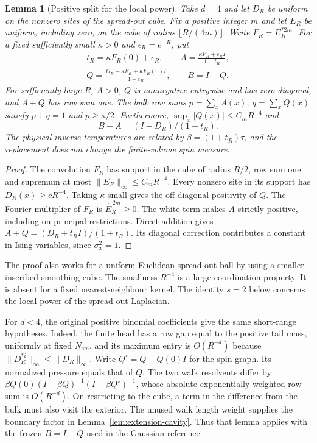 \documentclass[11pt]{article}
\newtheorem{lemma}[theorem]{Lemma}
\theoremstyle{definition}
\begin{document}
\begin{lemma}[Positive split for the local power]
\label{lem:local-split}
Take \(d=4\) and let \(D_R\) be uniform on the nonzero sites of
the spread-out cube. Fix a positive integer \(m\) and let
\(E_R\) be uniform, including zero, on the cube of radius
\(\lfloor R/(4m)\rfloor\). Write \(F_R=E_R^{*2m}\). For a fixed
sufficiently small \(\kappa>0\) and \(\epsilon_R=e^{-R}\), put
\begin{equation}
 \begin{gathered}
 t_R=\kappa F_R(0)+\epsilon_R,\qquad
 A=\frac{\kappa F_R+\epsilon_R I}{1+t_R},\\
 Q=\frac{D_R-\kappa F_R+\kappa F_R(0)I}{1+t_R},\qquad B=I-Q .
 \end{gathered}
\end{equation}
For sufficiently large \(R\), \(A>0\), \(Q\) is nonnegative
entrywise and has zero diagonal, and \(A+Q\) has row sum one.
The bulk row sums \(p=\sum_xA(x)\), \(q=\sum_xQ(x)\) satisfy
\(p+q=1\) and \(p\ge\kappa/2\). Furthermore,
\(\sup_x |Q(x)|\le C_m R^{-4}\) and
\begin{equation}
 B-A=(I-D_R)/(1+t_R).
\end{equation}
The physical inverse temperatures are related by
\(\beta=(1+t_R)\tau\), and the replacement does not change the
finite-volume spin measure.
\end{lemma}

\begin{proof}
The convolution \(F_R\) has support in the cube of radius \(R/2\),
row sum one and supremum at most \(\|E_R\|_\infty\le C_m R^{-4}\).
Every nonzero site in its support has \(D_R(x)\ge cR^{-4}\).
Taking \(\kappa\) small gives the off-diagonal positivity of \(Q\).
The Fourier multiplier of \(F_R\) is \(\widehat E_R^{\,2m}\ge0\).
The white term makes \(A\) strictly positive, including on
principal restrictions. Direct addition gives
\(A+Q=(D_R+t_RI)/(1+t_R)\). Its diagonal correction contributes a
constant in Ising variables, since \(\sigma_x^2=1\).
\end{proof}

The proof also works for a uniform Euclidean spread-out ball by
using a smaller inscribed smoothing cube. The smallness
\(R^{-4}\) is a large-coordination property. It is absent for a
fixed nearest-neighbour kernel. The identity \(s=2\) below concerns
the local power of the spread-out Laplacian.

For \(d<4\), the original positive binomial coefficients give the
same short-range hypotheses. Indeed, the finite head has a row
gap equal to the positive tail mass, uniformly at fixed
\(N_{\mathrm{sm}}\), and its maximum entry is \(O(R^{-d})\) because
\(\|D_R^{*i}\|_\infty\le\|D_R\|_\infty\). Write \(Q^\circ=Q-Q(0)I\) for the spin graph. Its normalized
pressure equals that of \(Q\). The two walk resolvents differ by
\(\beta Q(0)(I-\beta Q)^{-1}(I-\beta Q^\circ)^{-1}\), whose absolute
exponentially weighted row sum is \(O(R^{-d})\). On restricting to
the cube, a term in the difference from the bulk must also visit
the exterior. The unused walk length weight supplies the boundary
factor in Lemma~\ref{lem:extension-cavity}. Thus that lemma applies
with the frozen \(B=I-Q\) used in the Gaussian reference.
\end{document}
